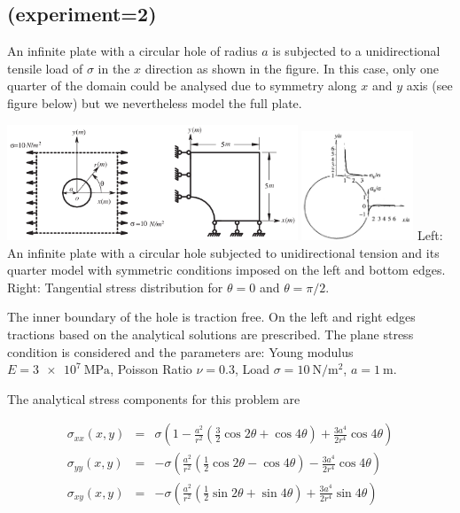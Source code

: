\newpage
\subsection*{\textcite{rama16} (experiment=2)}

An infinite plate with a circular hole of radius $a$  
is subjected to a unidirectional tensile load of $\sigma$ in the $x$ direction as shown
in the figure. In this case, only one quarter of the domain could be analysed due
to symmetry along $x$ and $y$ axis (see figure below) but we nevertheless model the full plate.

\begin{center}
\includegraphics[width=0.65\textwidth]{python_codes/fieldstone_124/images/yobu02}
\includegraphics[width=0.25\textwidth]{python_codes/fieldstone_124/images/yobu02b}
{\captionfont Left: An infinite plate with a circular hole subjected to unidirectional tension 
and its quarter model with symmetric conditions imposed on the left and bottom edges.
Right: Tangential stress distribution for $\theta=0$  and $\theta=\pi/2$. \cite{yobu02}}
\end{center}


The inner boundary of the hole is traction free. 
On the left and right edges tractions based on the analytical solutions are prescribed.
The {\color{red}plane stress} condition is considered and the parameters are: 
Young modulus $E=\SI{3e7}{\mega\pascal}$, Poisson Ratio $\nu=0.3$, 
Load $\sigma=10~\si{\newton\per\square\meter}$, $a=1~\si{\meter}$.

The analytical stress components for this problem are  

\begin{eqnarray}
\sigma_{xx}(x,y) &=& \sigma \left(  1-\frac{a^2}{r^2}\left(\frac{3}{2}\cos 2\theta + \cos 4\theta \right) 
+ \frac{3a^4}{2r^4} \cos 4\theta \right) \\
\sigma_{yy}(x,y) &=& -\sigma \left( \frac{a^2}{r^2} \left(\frac{1}{2}\cos 2\theta - \cos 4\theta \right) 
- \frac{3a^4}{2r^4} \cos 4\theta \right) \\
\sigma_{xy}(x,y) &=& -\sigma \left( \frac{a^2}{r^2} \left(\frac{1}{2}\sin 2\theta + \sin 4\theta\right) 
+ \frac{3a^4}{2r^4} \sin 4\theta \right) 
\end{eqnarray}

